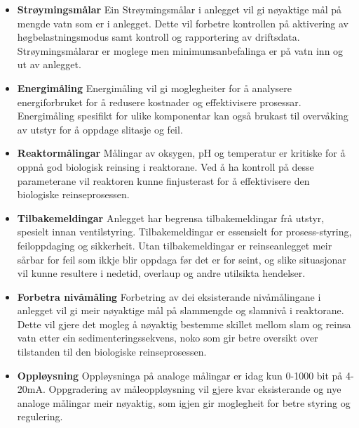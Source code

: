 \begin{itemize}
    \item \textbf{Strøymingsmålar} \newline
        Ein Strøymingsmålar i anlegget vil gi nøyaktige mål på mengde vatn som er i anlegget.
        Dette vil forbetre kontrollen på aktivering av høgbelastningsmodus samt kontroll og rapportering av driftsdata.
        Strøymingsmålarar er moglege men minimumsanbefalinga er på vatn inn og ut av anlegget.
    \item \textbf{Energimåling} \newline
        Energimåling vil gi moglegheiter for å analysere energiforbruket for å redusere kostnader og effektivisere prosessar.
        Energimåling spesifikt for ulike komponentar kan også brukast til overvåking av utstyr for å oppdage slitasje og feil.
    \item \textbf{Reaktormålingar} \newline
        Målingar av oksygen, pH og temperatur er kritiske for å oppnå god biologisk reinsing i reaktorane.\newline
        Ved å ha kontroll på desse parameterane vil reaktoren kunne finjusterast for å effektivisere den biologiske reinseprosessen.
    \item \textbf{Tilbakemeldingar} \newline
        Anlegget har begrensa tilbakemeldingar frå utstyr, spesielt innan ventilstyring.
        Tilbakemeldingar er essensielt for prosess-styring, feiloppdaging og sikkerheit.
        Utan tilbakemeldingar er reinseanlegget meir sårbar for feil som ikkje blir oppdaga før det er for seint, 
        og slike situasjonar vil kunne resultere i nedetid, overlaup og andre utilsikta hendelser.
    \item \textbf{Forbetra nivåmåling} \newline
        Forbetring av dei eksisterande nivåmålingane i anlegget vil gi meir nøyaktige mål på slammengde og slamnivå i reaktorane.
        Dette vil gjere det mogleg å nøyaktig bestemme skillet mellom slam og reinsa vatn etter ein sedimenteringssekvens,
        noko som gir betre oversikt over tilstanden til den biologiske reinseprosessen.
    \item \textbf{Oppløysning} \newline
        Oppløysninga på analoge målingar er idag kun 0-1000 bit på 4-20mA. \newline
        Oppgradering av måleoppløysning vil gjere kvar eksisterande og nye analoge målingar
        meir nøyaktig, som igjen gir moglegheit for betre styring og regulering.
\end{itemize}
\newpage


